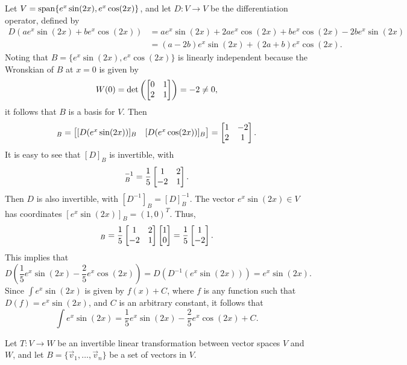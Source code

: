 \documentclass{homework}
\begin{document}
	\question Let $V = \mathrm{span}\{e^x\sin(2x), e^x\cos(2x)\}$, and let $D : V \to V$ be the differentiation operator, defined by
	\begin{equation*}
	\begin{aligned}
		D(ae^x\sin(2x) + be^x\cos(2x)) &= ae^x\sin(2x) + 2ae^x\cos(2x) + be^x\cos(2x) - 2be^x\sin(2x) \\
		&= (a-2b)e^x\sin(2x) + (2a+b)e^x\cos(2x).
	\end{aligned}
	\end{equation*}
	Noting that $B = \{e^x\sin(2x), e^x\cos(2x)\}$ is linearly independent because the Wronskian of $B$ at $x=0$ is given by
	\begin{equation*}
		W(0) = \det\left(\left[\begin{matrix}0 & 1 \\ 2 & 1\end{matrix}\right]\right) = -2 \ne 0,
	\end{equation*}
	it follows that $B$ is a basis for $V$. Then
	\begin{equation*}
		[D]_B = \mat{[D(e^x\sin(2x))]_B & [D(e^x\cos(2x))]_B} = \mat{1 & -2 \\ 2 & 1}.
	\end{equation*}
	It is easy to see that $[D]_B$ is invertible, with 
	\begin{equation*}
		[D]_B^{-1} = \frac{1}{5}\mat{1 & 2 \\ -2 & 1}.
	\end{equation*}
	Then $D$ is also invertible, with $[D^{-1}]_B = [D]_B^{-1}$. The vector $e^x\sin(2x) \in V$ has coordinates $[e^x\sin(2x)]_B = (1, 0)^T$. Thus, 
	\begin{equation*}
		[D^{-1}(e^x\sin(2x))]_B = \frac{1}{5}\mat{1 & 2 \\ -2 & 1}\mat{1 \\ 0} = \frac{1}{5}\mat{1 \\ -2}.
	\end{equation*}
	This implies that
	\begin{equation*}
		D\left(\frac{1}{5}e^x\sin(2x) - \frac{2}{5}e^x\cos(2x)\right) = D(D^{-1}(e^x\sin(2x))) = e^x\sin(2x).
	\end{equation*}
	Since $\int e^x\sin(2x)$ is given by $f(x) + C$, where $f$ is any function such that $D(f) = e^x\sin(2x)$, and $C$ is an arbitrary constant, it follows that
	\begin{equation*}
		\int e^x\sin(2x) = \frac{1}{5}e^x\sin(2x) - \frac{2}{5}e^x\cos(2x) +C.
	\end{equation*}
	
	\question Let $T : V \to W$ be an invertible linear transformation between vector spaces $V$ and $W$, and let $B = \{\vec{v}_1, \dots, \vec{v}_n\}$ be a set of vectors in $V$.
	
\end{document}
